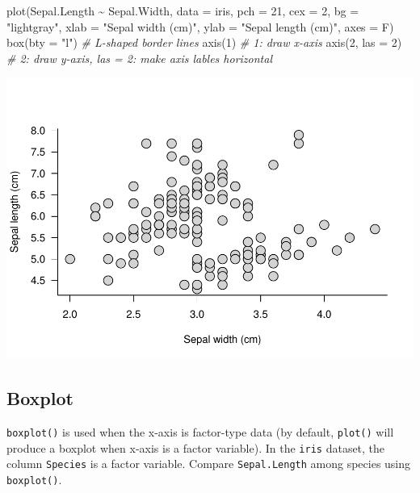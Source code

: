 \documentclass[
]{article}
\newenvironment{Shaded}{\begin{snugshade}}{\end{snugshade}}
\newcommand{\AttributeTok}[1]{\textcolor[rgb]{0.77,0.63,0.00}{#1}}
\newcommand{\CommentTok}[1]{\textcolor[rgb]{0.56,0.35,0.01}{\textit{#1}}}
\newcommand{\DecValTok}[1]{\textcolor[rgb]{0.00,0.00,0.81}{#1}}
\newcommand{\FunctionTok}[1]{\textcolor[rgb]{0.00,0.00,0.00}{#1}}
\newcommand{\NormalTok}[1]{#1}
\newcommand{\SpecialCharTok}[1]{\textcolor[rgb]{0.00,0.00,0.00}{#1}}
\newcommand{\StringTok}[1]{\textcolor[rgb]{0.31,0.60,0.02}{#1}}
\begin{document}
\begin{Shaded}
\begin{Highlighting}[]
\FunctionTok{plot}\NormalTok{(Sepal.Length }\SpecialCharTok{\textasciitilde{}}\NormalTok{ Sepal.Width, }\AttributeTok{data =}\NormalTok{ iris,}
     \AttributeTok{pch =} \DecValTok{21}\NormalTok{, }\AttributeTok{cex =} \DecValTok{2}\NormalTok{, }\AttributeTok{bg =} \StringTok{"lightgray"}\NormalTok{,}
     \AttributeTok{xlab =} \StringTok{"Sepal width (cm)"}\NormalTok{, }\AttributeTok{ylab =} \StringTok{"Sepal length (cm)"}\NormalTok{,}
     \AttributeTok{axes =}\NormalTok{ F)}
\FunctionTok{box}\NormalTok{(}\AttributeTok{bty =} \StringTok{"l"}\NormalTok{) }\CommentTok{\# L{-}shaped border lines}
\FunctionTok{axis}\NormalTok{(}\DecValTok{1}\NormalTok{) }\CommentTok{\# 1: draw x{-}axis}
\FunctionTok{axis}\NormalTok{(}\DecValTok{2}\NormalTok{, }\AttributeTok{las =} \DecValTok{2}\NormalTok{) }\CommentTok{\# 2: draw y{-}axis, las = 2: make axis lables horizontal}
\end{Highlighting}
\end{Shaded}

\begin{center}\includegraphics{biostats_files/figure-latex/unnamed-chunk-129-1} \end{center}

\hypertarget{boxplot-1}{%
\subsection{Boxplot}\label{boxplot-1}}

\texttt{boxplot()} is used when the x-axis is factor-type data (by default, \texttt{plot()} will produce a boxplot when x-axis is a factor variable). In the \texttt{iris} dataset, the column \texttt{Species} is a factor variable. Compare \texttt{Sepal.Length} among species using \texttt{boxplot()}.
\end{document}
